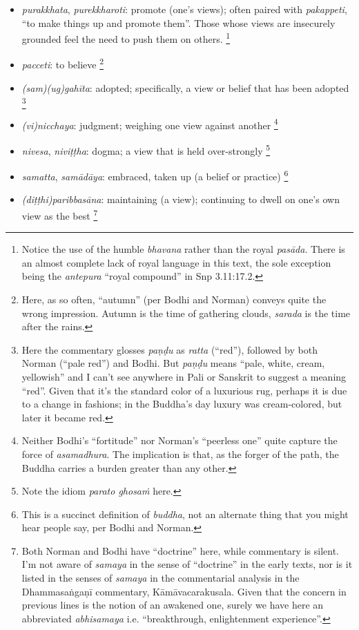 \documentclass[12pt,openany]{book}%
\begin{document}
\begin{itemize}
\item \textit{purakkhata}, \textit{purekkharoti}: promote (one’s views); often paired with \textit{pakappeti}, “to make things up and promote them”. Those whose views are insecurely grounded feel the need to push them on others. \footnote{Notice the use of the humble \textit{bhavana} rather than the royal \textit{\textsanskrit{pasāda}}. There is an almost complete lack of royal language in this text, the sole exception being the \textit{antepura} “royal compound” in Snp 3.11:17.2. }%
\item \textit{pacceti}: to believe \footnote{Here, as so often, “autumn” (per Bodhi and Norman) conveys quite the wrong impression. Autumn is the time of gathering clouds, \textit{sarada} is the time after the rains. }%
\item \textit{(sam)(ug)\textsanskrit{gahīta}}: adopted; specifically, a view or belief that has been adopted \footnote{Here the commentary glosses \textit{\textsanskrit{paṇḍu}} as \textit{ratta} (“red”), followed by both Norman (“pale red”) and Bodhi. But \textit{\textsanskrit{paṇḍu}} means “pale, white, cream, yellowish” and I can’t see anywhere in Pali or Sanskrit to suggest a meaning “red”. Given that it’s the standard color of a luxurious rug, perhaps it is due to a change in fashions; in the Buddha’s day luxury was cream-colored, but later it became red. }%
\item \textit{(vi)nicchaya}: judgment; weighing one view against another \footnote{Neither Bodhi’s “fortitude” nor Norman’s “peerless one” quite capture the force of \textit{asamadhura}. The implication is that, as the forger of the path, the Buddha carries a burden greater than any other. }%
\item \textit{nivesa}, \textit{\textsanskrit{niviṭṭha}}: dogma; a view that is held over-strongly \footnote{Note the idiom \textit{parato \textsanskrit{ghosaṁ}} here. }%
\item \textit{samatta}, \textit{\textsanskrit{samādāya}}: embraced, taken up (a belief or practice) \footnote{This is a succinct definition of \textit{buddha}, not an alternate thing that you might hear people say, per Bodhi and Norman. }%
\item \textit{(\textsanskrit{diṭṭhi})\textsanskrit{paribbasāna}}: maintaining (a view); continuing to dwell on one’s own view as the best \footnote{Both Norman and Bodhi have “doctrine” here, while commentary is silent. I’m not aware of \textit{samaya} in the sense of “doctrine” in the early texts, nor is it listed in the senses of \textit{samaya} in the commentarial analysis in the \textsanskrit{Dhammasaṅgaṇī} commentary, \textsanskrit{Kāmāvacarakusala}. Given that the concern in previous lines is the notion of an awakened one, surely we have here an abbreviated \textit{abhisamaya} i.e. “breakthrough, enlightenment experience”. }%
\end{itemize}
\end{document}
